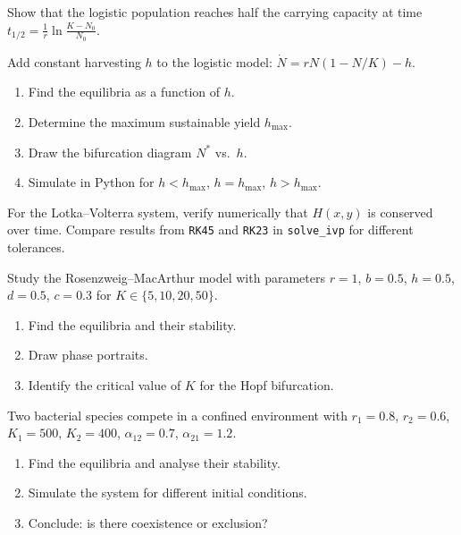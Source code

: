 \begin{exercise}
Show that the logistic population reaches half the carrying capacity at
time $t_{1/2} = \frac{1}{r}\ln\frac{K-N_0}{N_0}$.
\end{exercise}

\begin{exercise}
Add constant harvesting $h$ to the logistic model:
$\dot{N} = rN(1-N/K) - h$.
\begin{enumerate}
  \item Find the equilibria as a function of $h$.
  \item Determine the maximum sustainable yield $h_{\max}$.
  \item Draw the bifurcation diagram $N^*$ vs.\ $h$.
  \item Simulate in Python for $h < h_{\max}$, $h = h_{\max}$,
    $h > h_{\max}$.
\end{enumerate}
\end{exercise}

\begin{exercise}
For the Lotka--Volterra system, verify numerically that $H(x,y)$ is
conserved over time.  Compare results from \texttt{RK45} and
\texttt{RK23} in \texttt{solve\_ivp} for different tolerances.
\end{exercise}

\begin{exercise}
Study the Rosenzweig--MacArthur model with parameters $r=1$, $b=0.5$,
$h=0.5$, $d=0.5$, $c=0.3$ for $K\in\{5,10,20,50\}$.
\begin{enumerate}
  \item Find the equilibria and their stability.
  \item Draw phase portraits.
  \item Identify the critical value of $K$ for the Hopf bifurcation.
\end{enumerate}
\end{exercise}

\begin{exercise}
Two bacterial species compete in a confined environment with $r_1=0.8$,
$r_2=0.6$, $K_1=500$, $K_2=400$, $\alpha_{12}=0.7$, $\alpha_{21}=1.2$.
\begin{enumerate}
  \item Find the equilibria and analyse their stability.
  \item Simulate the system for different initial conditions.
  \item Conclude: is there coexistence or exclusion?
\end{enumerate}
\end{exercise}
